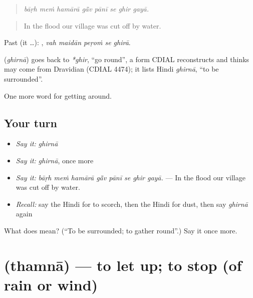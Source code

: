 \begin{quote}
       
\end{quote}

\begin{quote}
\emph{bāṛh meṁ hamārā gā̃v pānī se ghir gayā.}
\end{quote}

\begin{quote}
In the flood our village was cut off by water.
\end{quote}

Past (it …):     , \emph{vah maidān peṛoṁ se ghirā}.

\begin{cousinweb}
\textbf{} (\emph{ghirnā}) goes back to \emph{*ghir}, \textquotedblleft{}go round\textquotedblright{}, a form CDIAL reconstructs and thinks may come from Dravidian (CDIAL 4474); it lists Hindi \emph{ghirnā}, \textquotedblleft{}to be surrounded\textquotedblright{}.
\end{cousinweb}

\begin{grammarlens}[title={What you've built}]
One more word for getting around.
\end{grammarlens}

\subsection*{Your turn}
\begin{itemize}
\raggedright
  \item \emph{Say it:} \emph{ghirnā}
  \item \emph{Say it:} \emph{ghirnā}, once more
  \item \emph{Say it:} \emph{bāṛh meṁ hamārā gā̃v pānī se ghir gayā.} — In the flood our village was cut off by water.
  \item \emph{Recall:} say the Hindi for to scorch, then the Hindi for dust, then say \emph{ghirnā} again
\end{itemize}

\begin{tcolorbox}[breakable,colback=teal!4,colframe=teal!35!black,title={Before you move on}]
What does  mean? (\textquotedblleft{}To be surrounded; to gather round\textquotedblright{}.) Say it once more.
\end{tcolorbox}
\section[\texorpdfstring{\hi{थमना} (thamnā)}{थमना (thamnā)}]{ (thamnā) — to let up; to stop (of rain or wind)}

